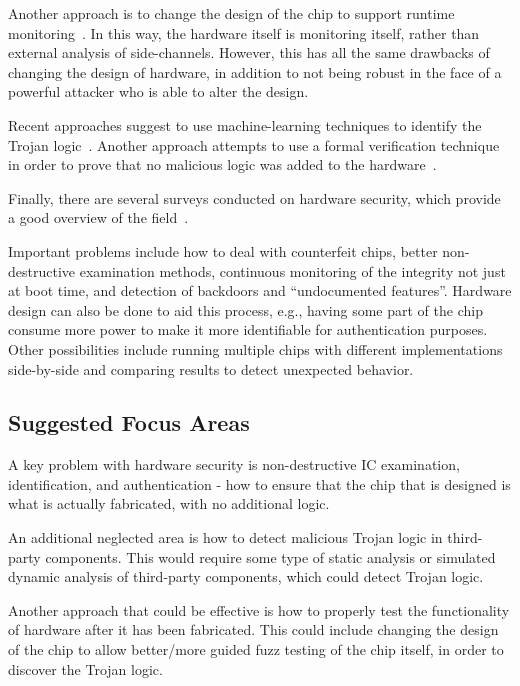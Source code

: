 \documentclass[11pt,letterpaper]{article}
\begin{document}
Another approach is to change the design of the chip to support
runtime monitoring~\cite{Waksman2010}. In this way, the hardware
itself is monitoring itself, 
rather than external analysis of
side-channels. However, this has all the same drawbacks of changing
the design of hardware, in addition to not being robust in the face of
a powerful attacker who is able to alter the design. 

Recent approaches suggest to use machine-learning techniques to
identify the Trojan logic~\cite{Haider2015}. Another approach attempts
to use a formal verification technique in order to prove that no
malicious logic was added to the hardware~\cite{Guo2015}.

Finally, there are several surveys conducted on hardware security,
which provide a good overview of the field~\cite{Wang2008,
  Tehranipoor2010, Guin2014, Guin2014a, Guin2014b}.

Important problems include how to deal with counterfeit chips, better
non-destructive examination methods, continuous monitoring of the
integrity not just at boot time, and detection of backdoors and 
``undocumented features''.  Hardware design can also be done to
aid this process, e.g., having some part of the chip consume more power
to make it more identifiable for authentication purposes.  Other
possibilities include running multiple chips with different
implementations side-by-side and comparing results to detect unexpected
behavior.

\subsection{Suggested Focus Areas}

A key problem with hardware security is non-destructive IC
examination, identification, and authentication - how to ensure that
the chip that is designed is what is actually fabricated, with no
additional logic.

An additional neglected area is how to detect malicious Trojan logic
in third-party components. This would require some type of static
analysis or simulated dynamic analysis of third-party components,
which could detect Trojan logic.

Another approach that could be effective is how to properly test the
functionality of hardware after it has been fabricated. This could
include changing the design of the chip to allow better/more guided
fuzz testing of the chip itself, in order to discover the Trojan
logic.
\end{document}
